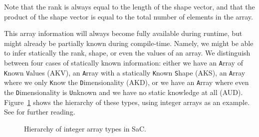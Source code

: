 \documentclass[sigconf,screen]{acmart}
\begin{document}
Note that the rank is always equal to the length of the shape vector, and that the product of the shape vector is equal to the total number of elements in the array.

This array information will always become fully available during runtime, but might already be partially known during compile-time.
Namely, we might be able to infer statically the rank, shape, or even the values of an array.
We distinguish between four cases of statically known information: either we have an \texttt{A}rray of \texttt{K}nown \texttt{V}alues (AKV), an \texttt{A}rray with a statically \texttt{K}nown \texttt{S}hape (AKS), an \texttt{A}rray where we only \texttt{K}now the \texttt{D}imensionality (AKD), or we have an \texttt{A}rray where even the \texttt{D}imensionality is \texttt{U}nknown and we have no static knowledge at all (AUD).
Figure~\ref{fig:hierarchy} shows the hierarchy of these types, using integer arrays as an example.
See \cite{sac-array} for further reading.

\begin{figure}[!ht]
  \small
  \caption{Hierarchy of integer array types in SaC.}
  \label{fig:hierarchy}
\end{figure}
\end{document}
